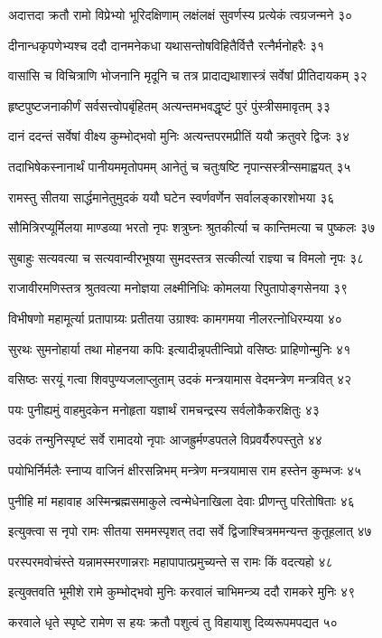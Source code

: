अदात्तदा क्रतौ रामो विप्रेभ्यो भूरिदक्षिणाम्
लक्षंलक्षं सुवर्णस्य प्रत्येकं त्वग्रजन्मने ३०

दीनान्धकृपणेभ्यश्च ददौ दानमनेकधा
यथासन्तोषविहितैर्वित्तै रत्नैर्मनोहरैः ३१

वासांसि च विचित्राणि भोजनानि मृदूनि च
तत्र प्रादाद्यथाशास्त्रं सर्वेषां प्रीतिदायकम् ३२

हृष्टपुष्टजनाकीर्णं सर्वसत्त्वोपबृंहितम्
अत्यन्तमभवद्धृष्टं पुरं पुंस्त्रीसमावृतम् ३३

दानं ददन्तं सर्वेषां वीक्ष्य कुम्भोद्भवो मुनिः
अत्यन्तपरमप्रीतिं ययौ क्रतुवरे द्विजः ३४

तदाभिषेकस्नानार्थं पानीयममृतोपमम्
आनेतुं च चतुःषष्टि नृपान्सस्त्रीन्समाह्वयत् ३५

रामस्तु सीतया सार्द्धमानेतुमुदकं ययौ
घटेन स्वर्णवर्णेन सर्वालङ्कारशोभया ३६

सौमित्रिरप्यूर्मिलया माण्डव्या भरतो नृपः
शत्रुघ्नः श्रुतकीर्त्या च कान्तिमत्या च पुष्कलः ३७

सुबाहुः सत्यवत्या च सत्यवान्वीरभूषया
सुमदस्तत्र सत्कीर्त्या राज्ञ्या च विमलो नृपः ३८

राजावीरमणिस्तत्र श्रुतवत्या मनोज्ञया
लक्ष्मीनिधिः कोमलया रिपुतापोङ्गसेनया ३९

विभीषणो महामूर्त्या प्रतापाग्र्यः प्रतीतया
उग्राश्वः कामगमया नीलरत्नोधिरम्यया ४०

सुरथः सुमनोहार्या तथा मोहनया कपिः
इत्यादीन्नृपतीन्विप्रो वसिष्ठः प्राहिणोन्मुनिः ४१

वसिष्ठः सरयूं गत्वा शिवपुण्यजलाप्लुताम्
उदकं मन्त्रयामास वेदमन्त्रेण मन्त्रवित् ४२

पयः पुनीह्यमुं वाहमुदकेन मनोहृता
यज्ञार्थं रामचन्द्रस्य सर्वलोकैकरक्षितुः ४३

उदकं तन्मुनिस्पृष्टं सर्वे रामादयो नृपाः
आजह्रुर्मण्डपतले विप्रवर्यैरुपस्तुते ४४

पयोभिर्निर्मलैः स्नाप्य वाजिनं क्षीरसन्निभम्
मन्त्रेण मन्त्रयामास राम हस्तेन कुम्भजः ४५

पुनीहि मां महावाह अस्मिन्ब्रह्मसमाकुले
त्वन्मेधेनाखिला देवाः प्रीणन्तु परितोषिताः ४६

इत्युक्त्वा स नृपो रामः सीतया सममस्पृशत्
तदा सर्वे द्विजाश्चित्रममन्यन्त कुतूहलात् ४७

परस्परमवोचंस्ते यन्नामस्मरणान्नराः
महापापात्प्रमुच्यन्ते स रामः किं वदत्यहो ४८

इत्युक्तवति भूमीशे रामे कुम्भोद्भवो मुनिः
करवालं चाभिमन्त्र्य ददौ रामकरे मुनिः ४९

करवाले धृते स्पृष्टे रामेण स हयः क्रतौ
पशुत्वं तु विहायाशु दिव्यरूपमपद्यत ५०

